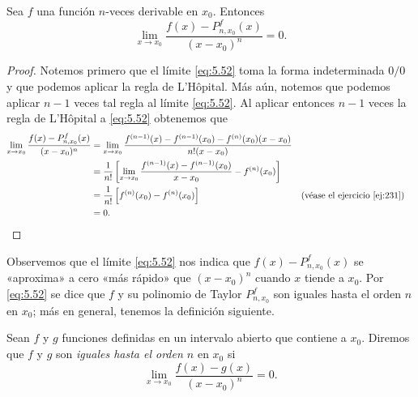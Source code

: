 \documentclass[12pt,a4paper]{book}
\begin{document}
    \begin{proposicion}\label{prop:69}
        Sea $f$ una función $n$-veces derivable en $x_{0}$. Entonces
        \begin{equation}\label{eq:5.52}
            \lim_{x\to x_{0}}\frac{f(x)-P^{f}_{n,x_{0}}(x)}{(x-x_{0})^{n}}=0.
        \end{equation}
    \end{proposicion}

    \begin{proof}
        Notemos primero que el límite \eqref{eq:5.52} toma la forma indeterminada
        $0/0$ y que podemos aplicar la regla de L'Hôpital. Más aún, notemos
        que podemos aplicar $n-1$ veces tal regla al límite \eqref{eq:5.52}. Al aplicar entonces
        $n-1$ veces la regla de L'Hôpital a \eqref{eq:5.52} obtenemos que
        \begin{align*}
            \lim_{x\to x_{0}}\frac{f(x)-P^{f}_{n,x_{0}}(x)}{(x-x_{0})^{n}}&=\lim_{x\to x_{0}}\frac{f^{(n-1)}(x)-f^{(n-1)}(x_{0})-f^{(n)}(x_{0})(x-x_{0})}{n!(x-x_{0})}\\
            &=\frac{1}{n!}\left[\lim_{x\to x_{0}}\frac{f^{(n-1)}(x)-f^{(n-1)}(x_{0})}{x-x_{0}}-f^{(n)}(x_{0})\right]\\
            &=\frac{1}{n!}\left[f^{(n)}(x_{0})-f^{(n)}(x_{0})\right] &&\text{(véase el ejercicio~\ref{ej:231})}\\
            &=0.\qedhere
        \end{align*}
    \end{proof}

    Observemos que el límite \eqref{eq:5.52} nos indica que $f(x)-P^{f}_{n,x_{0}}(x)$ se «aproxima»
    a cero «más rápido» que $(x-x_{0})^{n}$ cuando $x$ tiende a $x_{0}$. Por \eqref{eq:5.52}
    se dice que $f$ y su polinomio de Taylor $P^{f}_{n,x_{0}}$ son iguales hasta el orden $n$ en
    $x_{0}$; más en general, tenemos la definición siguiente.

    \begin{definicion}\label{def:56}
        Sean $f$ y $g$
        funciones definidas en un intervalo abierto que contiene a $x_{0}$. Diremos que $f$
        y $g$ son \textit{iguales hasta el orden $n$} en $x_{0}$ si
        \begin{equation*}
            \lim_{x\to x_{0}}\frac{f(x)-g(x)}{(x-x_{0})^{n}}=0.
        \end{equation*}
    \end{definicion}
\end{document}
